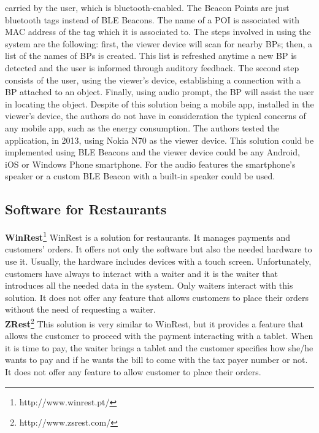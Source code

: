 carried by the user, which is bluetooth-enabled.
The Beacon Points are just bluetooth tags instead of
BLE Beacons. The name of a POI is associated with
MAC address of the tag which it is associated to.
The steps involved in using the system are the
following: first, the viewer device will scan
for nearby BPs; then, a list of the names of
BPs is created. This list is refreshed anytime a new
BP is detected and the user is informed through auditory
feedback. The second step consists of the user, using
the viewer's device, establishing a connection with a BP
attached to an object. Finally, using audio prompt, the BP
will assist the user in locating the object.
Despite of this solution being a mobile app, installed
in the viewer's device, the authors do not have in
consideration the typical concerns of any mobile app,
such as the energy consumption.
The authors tested the application, in 2013,
using Nokia N70 as the viewer device.
This solution could be implemented using BLE Beacons
and the viewer device could be any Android, iOS or
Windows Phone smartphone.
For the audio features the smartphone's speaker or
a custom BLE Beacon with a built-in speaker could be
used.

\subsection{Software for Restaurants}
\label{subs:software_for_restaurants}
\textbf{WinRest}\footnote{http://www.winrest.pt/}
WinRest is a solution for restaurants. It manages payments
and customers' orders. It offers not only the software but also the
needed hardware to use it. Usually, the hardware includes devices with
a touch screen. Unfortunately, customers have always to interact
with a waiter and it is the waiter that introduces all the needed data
in the system. Only waiters interact with this solution. It does not
offer any feature that allows customers to place their orders
without the need of requesting a waiter.
\\
\textbf{ZRest}\footnote{http://www.zsrest.com/}
This solution is very similar to WinRest, but it provides
a feature that allows the
customer to proceed with the payment interacting with a tablet.
When it is time to pay, the waiter brings a tablet and the customer
specifies how she/he wants to pay and if he wants the bill to come with
the tax payer number or not.
It does not offer any feature to allow customer to place their orders.
\\

